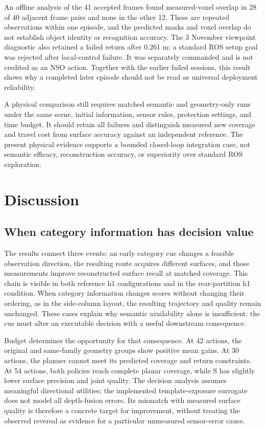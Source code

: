 \documentclass[11pt,a4paper]{article}
\providecommand{\hypertarget}[2]{#2}
\begin{document}
An offline analysis of the 41 accepted frames found measured-voxel overlap in 28 of 40 adjacent frame pairs and none in the other 12. These are repeated observations within one episode, and the predicted masks and voxel overlap do not establish object identity or recognition accuracy. The 3 November viewpoint diagnostic also retained a failed return after 0.261 m: a standard ROS setup goal was rejected after local-control failure. It was separately commanded and is not credited as an NSO action. Together with the earlier failed sessions, this result shows why a completed later episode should not be read as universal deployment reliability.

A physical comparison still requires matched semantic and geometry-only runs under the same scene, initial information, sensor rules, protection settings, and time budget. It should retain all failures and distinguish measured new coverage and travel cost from surface accuracy against an independent reference. The present physical evidence supports a bounded closed-loop integration case, not semantic efficacy, reconstruction accuracy, or superiority over standard ROS exploration.

\hypertarget{discussion}{%
\section{Discussion}\label{discussion}}

\hypertarget{when-category-information-has-decision-value}{%
\subsection{When category information has decision value}\label{when-category-information-has-decision-value}}

The results connect three events: an early category cue changes a feasible observation direction, the resulting route acquires different surfaces, and those measurements improve reconstructed surface recall at matched coverage. This chain is visible in both reference h1 configurations and in the rear-partition h1 condition. When category information changes scores without changing their ordering, as in the side-column layout, the resulting trajectory and quality remain unchanged. These cases explain why semantic availability alone is insufficient: the cue must alter an executable decision with a useful downstream consequence.

Budget determines the opportunity for that consequence. At 42 actions, the original and same-family geometry groups show positive mean gains. At 30 actions, the planner cannot meet its predicted coverage and return constraints. At 54 actions, both policies reach complete planar coverage, while S has slightly lower surface precision and joint quality. The decision analysis assumes meaningful directional utilities; the implemented template-exposure surrogate does not model all depth-fusion errors. Its mismatch with measured surface quality is therefore a concrete target for improvement, without treating the observed reversal as evidence for a particular unmeasured sensor-error cause.
\end{document}
